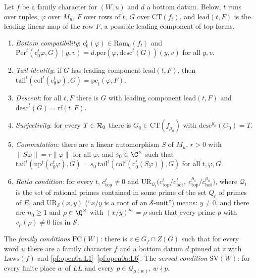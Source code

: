 \begin{definition}\label{pf:open0a:def:links}
Let $f$ be a family character for $(W,u)$ and $d$ a bottom datum. Below, $t$ runs over tuples, $\varphi$ over $M_u$, $F$
over rows of $t$, $G$ over $\mathrm{CT}(f_t)$, and $\mathrm{lead}(t,F)$ is the leading linear map of the row $F$, a
possible leading component of top forms.
\begin{enumerate}[label=(L\arabic*),leftmargin=*]
\item\label{pf:open0a:L1} \emph{Bottom compatibility}: $\mathrm c_0^t(\varphi)\in\mathrm{Ram}_0(f_t)$ and
$\mathrm{Per}^t(\mathrm c_0^t\varphi,G)(y,v)=d.\mathrm{per}(\varphi,\mathrm{desc}^t(G))(y,v)$ for all $y,v$.
\item\label{pf:open0a:L2} \emph{Tail identity}: if $G$ has leading component $\mathrm{lead}(t,F)$, then
$\mathrm{tail}^t(\mathrm{col}^t(\mathrm c_0^t\varphi),G)=\mathrm{pc}_t(\varphi,F)$.
\item\label{pf:open0a:L3} \emph{Descent}: for all $t,F$ there is $G$ with leading component $\mathrm{lead}(t,F)$ and
$\mathrm{desc}^t(G)=\mathrm{rf}(t,F)$.
\item\label{pf:open0a:L4} \emph{Surjectivity}: for every $T\in\mathcal{R}_0$ there is $G_0\in\mathrm{CT}(f_{\mu_0})$ with
$\mathrm{desc}^{\mu_0}(G_0)=T$.
\item\label{pf:open0a:L5} \emph{Commutation}: there are a linear automorphism $S$ of $M_u$, $r>0$ with
$\|S\varphi\|=r\|\varphi\|$ for all $\varphi$, and $s_0\in\C^\times$ such that
$\mathrm{tail}^t(\mathrm{up}^t(\mathrm c_0^t\varphi),G)=s_0\,\mathrm{tail}^t(\mathrm{col}^t(\mathrm c_0^t(S\varphi)),G)$
for all $t,\varphi,G$.
\item\label{pf:open0a:L6} \emph{Ratio condition}: for every $t$, $c_{\mathrm{top}}^t\ne0$ and
$\mathrm{UR}_{\mathcal Q_t}\bigl(c_{\mathrm{top}}^t/c_{\mathrm{bot}}^t,\ c_{\mathrm{top}}^{\mu_0}/c_{\mathrm{bot}}^{\mu_0}\bigr)$,
where $\mathcal Q_t$ is the set of rational primes contained in some prime of the set $Q_t$ of primes of $E$, and
$\mathrm{UR}_{\mathcal S}(x,y)$ (``$x/y$ is a root of an $\mathcal S$-unit'') means: $y\ne0$, and there are $n_0\ge1$
and $\rho\in\Q^\times$ with $(x/y)^{n_0}=\rho$ such that every prime $p$ with $v_p(\rho)\ne0$ lies in $\mathcal S$.
\end{enumerate}
The \emph{family conditions} $\mathrm{FC}(W)$: there is $z\in G_f\cap Z(G)$ such that for every word $u$ there are a
family character $f$ and a bottom datum $d$ pinned at $z$ with $\mathrm{Laws}(f)$ and
\ref{pf:open0a:L1}--\ref{pf:open0a:L6}. The \emph{served condition} $\mathrm{SV}(W)$: for every finite place $w$ of
$\mathit{LL}$ and every $p\in\mathcal Q_{\mu(w)}$, $w\nmid p$.
\ 
\end{definition}

